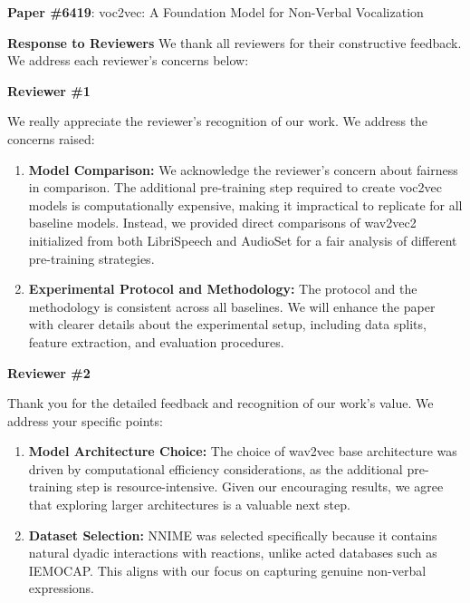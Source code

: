\documentclass[11pt]{article}
\begin{document}
\thispagestyle{empty}

\noindent\textbf{Paper \#6419}: voc2vec: A Foundation Model for Non-Verbal Vocalization

\noindent\textbf{Response to Reviewers}
\noindent We thank all reviewers for their constructive feedback. We address each reviewer's concerns below:

\vspace{2mm}
\noindent\colorbox{light-blue}{\parbox{\dimexpr\linewidth-2\fboxsep}{\textbf{Reviewer \#1}}}
\noindent We really appreciate the reviewer's recognition of our work. We address the concerns raised:

\begin{enumerate}[leftmargin=*,nosep]
\item \textbf{Model Comparison:} We acknowledge the reviewer's concern about fairness in comparison. The additional pre-training step required to create voc2vec models is computationally expensive, making it impractical to replicate for all baseline models. Instead, we provided direct comparisons of wav2vec2 initialized from both LibriSpeech and AudioSet for a fair analysis of different pre-training strategies.

\item \textbf{Experimental Protocol and Methodology:} The protocol and the methodology is consistent across all baselines. We will enhance the paper with clearer details about the experimental setup, including data splits, feature extraction, and evaluation procedures.
\end{enumerate}

\vspace{1mm}
\noindent\colorbox{light-blue}{\parbox{\dimexpr\linewidth-2\fboxsep}{\textbf{Reviewer \#2}}}
\noindent Thank you for the detailed feedback and recognition of our work's value. We address your specific points:

\begin{enumerate}[leftmargin=*,nosep]
\item \textbf{Model Architecture Choice:} The choice of wav2vec base architecture was driven by computational efficiency considerations, as the additional pre-training step is resource-intensive. Given our encouraging results, we agree that exploring larger architectures is a valuable next step.

\item \textbf{Dataset Selection:} NNIME was selected specifically because it contains natural dyadic interactions with reactions, unlike acted databases such as IEMOCAP. This aligns with our focus on capturing genuine non-verbal expressions.
\end{enumerate}
\end{document}
